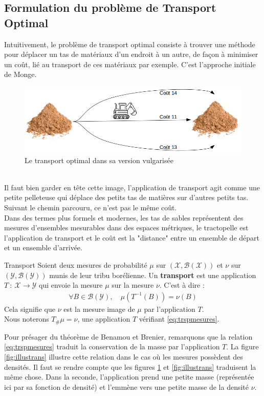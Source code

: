 \documentclass[a4paper,12pt]{article}
\begin{document}
\subsection{Formulation du problème de Transport Optimal}
Intuitivement, le problème de transport optimal consiste à trouver une méthode pour déplacer un tas de matériaux d'un endroit à un autre, de façon à minimiser un coût, lié au transport de ces matériaux par exemple. C'est l'approche initiale de Monge. 
\begin{figure}[!h]
\centering
\includegraphics[width=\linewidth]{img/tractopelle.png}
\caption{\label{fig:tractopelle}Le transport optimal dans sa version vulgarisée}
\end{figure}\\
Il faut bien garder en tête cette image, l'application de transport agit comme une petite pelleteuse qui déplace des petits tas de matières sur d'autres petits tas. Suivant le chemin parcouru, ce n'est pas le même coût. \\
Dans des termes plus formels et modernes, les tas de sables représentent des mesures d'ensembles mesurables dans des espaces métriques, le tractopelle est l'application de transport et le coût est la "distance" entre un ensemble de départ et un ensemble d'arrivée. 
\begin{definition}{Transport}
Soient deux mesures de probabilité $\mu$ sur $(\mathcal{X},\mathcal{B}(\mathcal{X}))$ et $\nu$ sur $(\mathcal{Y},\mathcal{B}(\mathcal{Y}))$ munis de leur tribu borélienne. Un \textbf{transport} est une application $T\ :\ \mathcal{X}\rightarrow\mathcal{Y}$ qui envoie la mesure $\mu$ sur la mesure $\nu$. C'est à dire : 
\begin{align}
\forall B\in\mathcal{B}(\mathcal{Y}),\quad \mu(T^{-1}(B))=\nu(B)
\label{eq:trspmesures}
\end{align}
Cela signifie que $\nu$ est la mesure image de $\mu$ par l'application $T$.\\
Nous noterons $T_{\#}\mu=\nu$, une application $T$ vérifiant \eqref{eq:trspmesures}.
\end{definition}
Pour présager du théorème de Benamou et Brenier, remarquons que la relation \eqref{eq:trspmesures} traduit la conservation de la masse par l'application $T$. La figure \ref{fig:illustrans} illustre cette relation dans le cas où les mesures possèdent des densités. Il faut se rendre compte que les figures \ref{fig:tractopelle} et \ref{fig:illustrans} traduisent la même chose. Dans la seconde, l'application prend une petite masse (représentée ici par sa fonction de densité) et l'emmène vers une petite masse de la densité $\nu$. 
\end{document}
